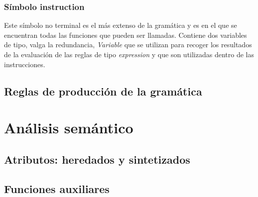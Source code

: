 \documentclass[a4paper,12pt,twoside,openright]{report}
\begin{document}
      \subsubsection{Símbolo instruction}
      Este símbolo no terminal es el más extenso de la gramática y es en el que se encuentran todas las funciones que 
      pueden ser llamadas. Contiene dos variables de tipo, valga la redundancia, \emph{Variable} que se utilizan para 
      recoger los resultados de la evaluación de las reglas de tipo \emph{expression} y que son utilizadas dentro de 
      las instrucciones.

    \subsection{Reglas de producción de la gramática}
   
  \section{Análisis semántico}
    \subsection{Atributos: heredados y sintetizados}
    
    \subsection{Funciones auxiliares}
\end{document}
